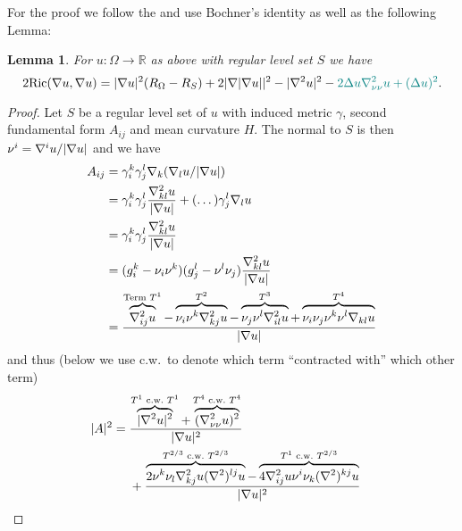 \documentclass[draft]{amsart}
\newtheorem{lemma}[theorem]{Lemma}
\newcommand*{\mathfullstop}{.}
\newcommand*{\maps}{\colon}
\newcommand*{\reals}{\mathbb{R}}
\newcommand*{\laplacian}{\Delta}
\DeclarePairedDelimiter{\abs}{\lvert}{\rvert} %
\newcommand{\Ricci}{\mathrm{Ric}} %
\begin{document}
\newcommand{\secondfundamentalform}{\Romannum{2}}
For the proof we follow the \cite[Proof of Proposition 4.2 in][]{brayHarmonicFunctionsMass2019} and use Bochner's identity as well as the following Lemma:
\begin{lemma}\label{lem:traced_gauss} 
    For \( u\maps \Omega\to \reals \) as above with regular level set \( S \) we have
    \begin{equation*}
        2\Ricci(\nabla u, \nabla u)=\abs{\nabla u}^2(R_\Omega-R_S)+2\abs{\nabla\abs{\nabla u}}^2-\abs{\nabla^2 u}^2-\nonHarmonic{2\laplacian u \nabla^2_{\nu\nu}u+(\laplacian u)^2}\mathfullstop
    \end{equation*}
\end{lemma}
\begin{proof}  
    Let \( S \) be a regular level set of \( u \) with induced metric \( \gamma \), second fundamental form \( A_{ij} \) and mean curvature \( H \). The normal to \( S \) is then \( \nu^i=\nabla^i u/\abs{\nabla u} \) and we have
    \begin{equation*}
        \begin{aligned}[t]
            A_{ij}&=\gamma^{k}_i\gamma^l_j \nabla_k (\nabla_l u/\abs{\nabla u})\\
            &=\gamma^{k}_i \gamma^{l}_j\frac{\nabla^2_{kl}u}{\abs{\nabla u}}+(\dotsc)\gamma^l_j\nabla_l u \\
            &=\gamma^{k}_i \gamma^l_j \frac{\nabla^2_{kl}u}{\abs{\nabla u}}\\
            &=(g^k_i-\nu_i \nu^k)(g^l_j - \nu^l \nu_j)\frac{\nabla^2_{kl}u}{\abs{\nabla u}}\\
            &=\frac{\overbrace{\nabla^2_{ij}u}^{    \text{Term \( T^1 \)}}-\overbrace{\nu_i \nu^k\nabla^2_{kj}u}^{T^2}-\overbrace{\nu_j \nu^l\nabla^2_{il}u}^{T^3}+\overbrace{\nu_i \nu_j \nu^k \nu^l\nabla_{kl}u}^{T^4}}{\abs{\nabla u}}
        \end{aligned}
    \end{equation*}
    and thus (below we use c.w.~to denote which term \enquote{contracted with} which other term)
    \newcommand{\cw}{\text{~c.w.~}}
    \begin{equation*}
        \begin{aligned}[t]
            \abs{A}^2&=\begin{aligned}[t]
                &\frac{\overbrace{\abs{\nabla^2 u}^2}^{T^1\cw T^1}+\overbrace{(\nabla^2_{\nu\nu}u)^2}^{T^4\cw T^4}}{\abs{\nabla u}^2}\\
            &+\frac{\overbrace{2\nu^k \nu_l \nabla^2_{kj}u (\nabla^2)^{lj}u}^{T^{2/3}\cw T^{2/3}}-\overbrace{4\nabla^2_{ij}u \nu^i \nu_k (\nabla^2)^{kj}u}^{T^{1}\cw T^{2/3}}}{\abs{\nabla u}^2}\\

\end{aligned}
\end{aligned}
\end{equation*}
\end{proof}
\end{document}
